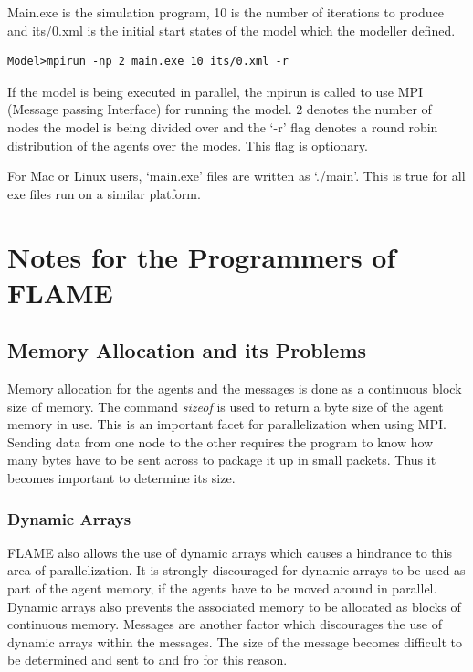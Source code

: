 \documentclass[a4paper,11pt]{article}
\newenvironment{mylisting}
{\begin{list}{}{\setlength{\leftmargin}{1em}}\item\small\bfseries}
{\end{list}}
\begin{document}
Main.exe is the simulation program, 10 is the number of iterations
to produce and its/0.xml is the initial start states of the model
which the modeller defined.

\begin{mylisting}
\begin{verbatim}
Model>mpirun -np 2 main.exe 10 its/0.xml -r
\end{verbatim}
\end{mylisting}

If the model is being executed in parallel, the mpirun is called to
use MPI (Message passing Interface) for running the model. 2 denotes
the number of nodes the model is being divided over and the `-r'
flag denotes a round robin distribution of the agents over the
modes. This flag is optionary.

For Mac or Linux users, `main.exe' files are written as `./main'.
This is true for all exe files run on a similar platform.


\section{Notes for the Programmers of FLAME}

\subsection{Memory Allocation and its Problems}

Memory allocation for the agents and the messages is done as a
continuous block size of memory. The command \emph{sizeof} is used
to return a byte size of the agent memory in use. This is an
important facet for parallelization when using MPI. Sending data
from one node to the other requires the program to know how many
bytes have to be sent across to package it up in small packets. Thus
it becomes important to determine its size.

\subsubsection{Dynamic Arrays} FLAME also allows the use of dynamic
arrays which causes a hindrance to this area of parallelization. It
is strongly discouraged for dynamic arrays to be used as part of the
agent memory, if the agents have to be moved around in parallel.
Dynamic arrays also prevents the associated memory to be allocated
as blocks of continuous memory. Messages are another factor which
discourages the use of dynamic arrays within the messages. The size
of the message becomes difficult to be determined and sent to and
fro for this reason.
\end{document}

